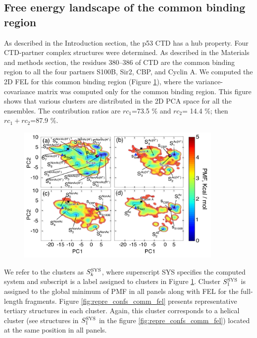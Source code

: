 \subsection{Free energy landscape of the common binding region}
As described in the Introduction section, the p53 CTD has a hub property. Four CTD-partner complex structures were determined. As described in the Materials and methods section, the residues 380–386 of CTD are the common binding region to all the four partners S100B, Sir2, CBP, and Cyclin A. We computed the 2D FEL for this common binding region (Figure \ref{fig:fel_common}), where the variance-covariance matrix was computed only for the common binding region. This figure shows that various clusters are distributed in the 2D PCA space for all the ensembles. The contribution ratios are  $rc_1$=73.5 \% and $rc_2$= 14.4 \%; then $rc_1+rc_2$=87.9 \%.

\begin{figure}
  \centering
  \includegraphics[width=10cm]{../single_CTD/figures_p53ctd/9.pdf}
  \caption{\label{fig:fel_common}}
\end{figure}

We refer to the clusters as $S_k^{\rm SYS}$, where superscript SYS specifies the computed system and subscript  is a label assigned to clusters in Figure \ref{fig:fel_common}. Cluster $S_1^{\rm SYS}$ is assigned to the global minimum of PMF in all panels along with FEL for the full-length fragments. Figure \ref{fig:repre_confs_comm_fel} presents representative tertiary structures in each cluster. Again, this cluster corresponds to a helical cluster (see structures in $S_1^{\rm SYS}$ in the figure \ref{fig:repre_confs_comm_fel}) located at the same position in all panels.

